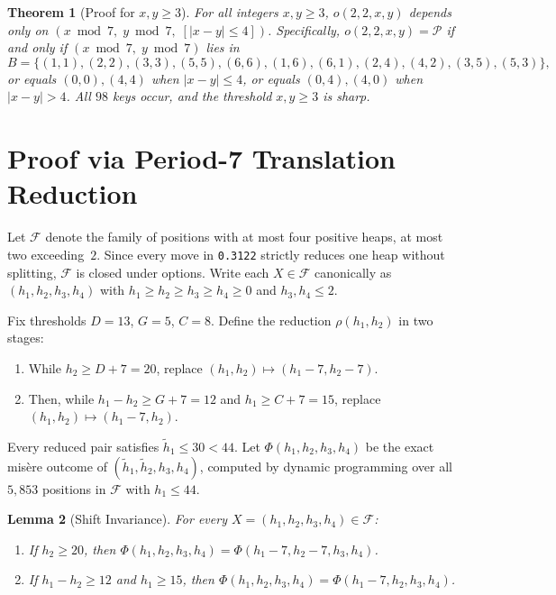 \documentclass[11pt]{article}
\newtheorem{theorem}{Theorem}
\newtheorem{lemma}[theorem]{Lemma}
\begin{document}
\begin{theorem}[Proof for $x, y \ge 3$]\label{thm:main}
For all integers $x, y \ge 3$, $o(2, 2, x, y)$ depends only on $(x \bmod 7,\; y \bmod 7,\; [|x - y| \le 4])$. Specifically, $o(2, 2, x, y) = \mathcal{P}$ if and only if $(x \bmod 7,\; y \bmod 7)$ lies in
\[
  B = \{(1,1),(2,2),(3,3),(5,5),(6,6),(1,6),(6,1),(2,4),(4,2),(3,5),(5,3)\},
\]
or equals $(0,0),(4,4)$ when $|x - y| \le 4$, or equals $(0,4),(4,0)$ when $|x - y| > 4$. All $98$ keys occur, and the threshold $x, y \ge 3$ is sharp.
\end{theorem}

\section{Proof via Period-7 Translation Reduction}

Let $\mathcal{F}$ denote the family of positions with at most four positive heaps, at most two exceeding~$2$. Since every move in \texttt{0.3122} strictly reduces one heap without splitting, $\mathcal{F}$ is closed under options. Write each $X \in \mathcal{F}$ canonically as $(h_1, h_2, h_3, h_4)$ with $h_1 \ge h_2 \ge h_3 \ge h_4 \ge 0$ and $h_3, h_4 \le 2$.

Fix thresholds $D = 13$, $G = 5$, $C = 8$. Define the reduction $\rho(h_1, h_2)$ in two stages:
\begin{enumerate}
  \item[$\rho_1$:] While $h_2 \ge D + 7 = 20$, replace $(h_1, h_2) \mapsto (h_1 - 7, h_2 - 7)$.
  \item[$\rho_2$:] Then, while $h_1 - h_2 \ge G + 7 = 12$ and $h_1 \ge C + 7 = 15$, replace $(h_1, h_2) \mapsto (h_1 - 7, h_2)$.
\end{enumerate}
Every reduced pair satisfies $\tilde{h}_1 \le 30 < 44$. Let $\Phi(h_1, h_2, h_3, h_4)$ be the exact mis\`{e}re outcome of $(\tilde{h}_1, \tilde{h}_2, h_3, h_4)$, computed by dynamic programming over all $5{,}853$ positions in $\mathcal{F}$ with $h_1 \le 44$.

\begin{lemma}[Shift Invariance]\label{lem:shift}
For every $X = (h_1, h_2, h_3, h_4) \in \mathcal{F}$:
\begin{enumerate}
  \item If $h_2 \ge 20$, then $\Phi(h_1, h_2, h_3, h_4) = \Phi(h_1 - 7, h_2 - 7, h_3, h_4)$.
  \item If $h_1 - h_2 \ge 12$ and $h_1 \ge 15$, then $\Phi(h_1, h_2, h_3, h_4) = \Phi(h_1 - 7, h_2, h_3, h_4)$.
\end{enumerate}
\end{lemma}
\end{document}
